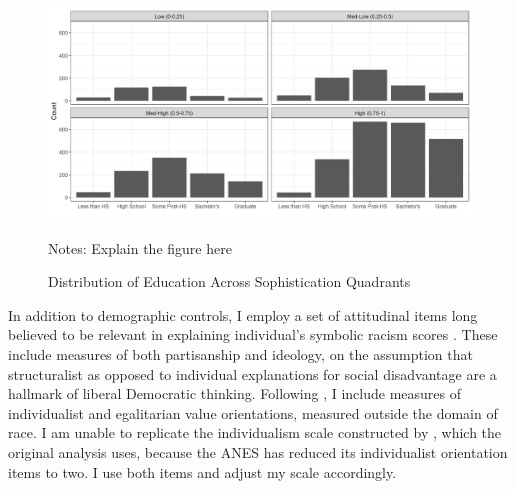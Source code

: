 \documentclass[12pt]{paper}
\begin{document}
\begin{figure}[H]
	\centering
	\includegraphics[scale=.5]{fig/soph-education.png}
	{\singlespacing
		\parbox{0.78\textwidth}{\scriptsize%
			Notes: Explain the figure here
	}}
	\caption{Distribution of Education Across Sophistication Quadrants}
	\label{educ}
\end{figure}


In addition to demographic controls, I employ a set of attitudinal items long believed to be relevant in explaining individual's symbolic racism scores \citep{kinder_divided_1997, sears_symbolic_1988}. These include measures of both partisanship and ideology, on the assumption that structuralist as opposed to individual explanations for social disadvantage are a hallmark of liberal Democratic thinking. Following \cite{feldman_structure_1988}, I include measures of individualist and egalitarian value orientations, measured outside the domain of race. I am unable to replicate the individualism scale constructed by \cite{henry_symbolic_2002}, which the original analysis uses, because the ANES has reduced its individualist orientation items to two. I use both items and adjust my scale accordingly.



\end{document}

